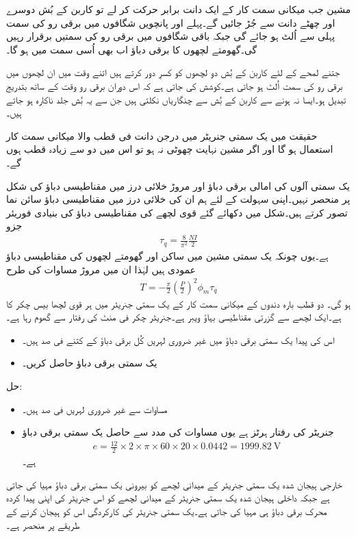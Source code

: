 مشین جب میکانی سمت کار کے ایک دانت برابر حرکت کر لے تو کاربن کے بُش دوسرے اور چھٹے دانت سے جُڑ جائیں گے۔پہلے اور پانچویں شگافوں میں برقی رو کی سمت پہلی سے اُلٹ ہو جائے گی جبکہ باقی شگافوں میں برقی رو کی سمتیں برقرار رہیں گی۔گھومتے لچھوں کا برقی دباؤ اب بھی اُسی سمت میں ہو گا۔

جتنے لمحے کے لئے  کاربن کے بُش دو لچھوں کو کسرِ دور کرتے ہیں اتنے وقت میں ان لچھوں میں برقی رو کی سمت اُلٹ ہو جاتی ہے۔کوشش کی جاتی ہے کہ  اس دوران برقی رو وقت کے ساتھ بتدریج تبدیل ہو۔ایسا نہ ہونے سے کاربن کے بُش سے چنگاریاں نکلتی ہیں جن سے یہ بُش جلد ناکارہ ہو جاتے ہیں۔

حقیقت میں یک سمتی جنریٹر میں درجن دانت فی قطب والا میکانی سمت کار استعمال ہو گا اور اگر مشین نہایت چھوٹی نہ ہو تو اس میں دو سے زیادہ قطب ہوں گے۔

یک سمتی آلوں کی امالی برقی دباؤ اور مروڑ خلائی درز میں مقناطیسی دباؤ کی شکل پر منحصر نہیں۔اپنی سہولت کے لئے ہم ان کی خلائی درز میں مقناطیسی دباؤ سائن نما تصور کرتے ہیں۔شکل  میں دکھائے گئے قوی لچھے کی مقناطیسی دباؤ کی بنیادی فوریئر جزو
\begin{align}
\tau_q=\frac{8}{\pi^2} \frac{N I}{2}
\end{align}
ہے۔یوں چونکہ یک سمتی مشین میں ساکن اور گھومتے لچھوں کی مقناطیسی دباؤ عمودی ہیں لہٰذا ان میں مروڑ مساوات  کی طرح
\begin{align}
T=-\frac{\pi}{2}\left( \frac{P}{2}\right)^2 \phi_m \tau_q 
\end{align} 
ہو گی۔
%
دو قطب بارہ دندوں کے میکانی سمت کار کے یک سمتی جنریٹر میں ہر قوی لچھا بیس چکر کا ہے۔ایک لچھے سے گزرتی مقناطیسی بہاؤ   ویبر ہے۔جنریٹر  چکر فی منٹ کی رفتار سے گھوم رہا ہے۔
\begin{itemize}
\item
اس کی پیدا یک سمتی برقی دباؤ میں غیر ضروری لہریں کُل برقی دباؤ کے کتنے فی صد ہیں۔
\item
یک سمتی برقی دباؤ حاصل کریں۔
\end{itemize}

حل:
\begin{itemize}
\item
مساوات  سے غیر ضروری لہریں  فی صد ہیں۔
\item
جنریٹر کی رفتار  ہرٹز ہے یوں مساوات  کی مدد سے حاصل یک سمتی برقی دباؤ
\begin{align*}
e=\frac{12}{2} \times 2 \times \pi \times 60 \times 20 \times 0.0442=\SI{1999.82}{\volt}
\end{align*}
ہے۔
\end{itemize}
%
خارجی ہیجان شدہ یک سمتی جنریٹر کے میدانی لچھے کو بیرونی یک سمتی برقی دباؤ مہیا کی جاتی ہے جبکہ داخلی ہیجان شدہ یک سمتی جنریٹر کے میدانی لچھے کو اس جنریٹر کی اپنی پیدا کردہ محرک برقی دباؤ ہی مہیا کی جاتی ہے۔یک سمتی جنریٹر کی کارکردگی اس کو ہیجان کرنے کے طریقے پر منحصر ہے۔

